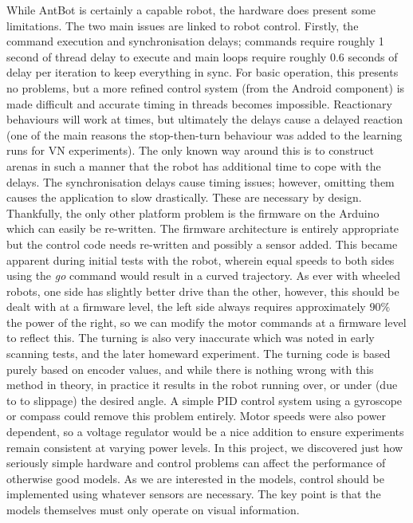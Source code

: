 \documentclass[a4paper,12pt,twoside,openright]{article}
\begin{document}
While AntBot is certainly a capable robot, the hardware does present some limitations. The two main issues
are linked to robot control. Firstly, the command execution and synchronisation delays; commands require roughly
1 second of thread delay to execute and main loops require roughly 0.6 seconds of delay per iteration to keep
everything in sync. For basic operation, this presents no problems, but a more refined control system (from the Android component)
is made difficult and accurate timing in threads becomes impossible. Reactionary
behaviours will work at times, but ultimately the delays cause a delayed reaction (one of the main reasons the
stop-then-turn behaviour was added to the learning runs for VN experiments). The only known way around this
is to construct arenas in such a manner that the robot has additional time to cope with the delays. The
synchronisation delays cause timing issues; however, omitting them causes the application to slow drastically.
These are necessary by design. Thankfully, the only other platform problem is the firmware on the Arduino
which can easily be re-written. The firmware architecture is entirely appropriate but the control code
needs re-written and possibly a sensor added. This became apparent during initial tests with the robot, wherein
equal speeds to both sides using the \textit{go} command would result in a curved trajectory. As ever with
wheeled robots, one side has slightly better drive than the other, however, this should be dealt with at a
firmware level, the left side always requires approximately $90\%$ the power of the right, so we can
modify the motor commands at a firmware level to reflect this. The turning is also very inaccurate which
was noted in early scanning tests, and the later homeward experiment. The turning code is based purely based on
encoder values, and while there is nothing wrong with this method in theory, in practice it results in the robot
running over, or under (due to to slippage) the desired angle. A simple PID control system using a gyroscope
or compass could remove this problem entirely. Motor speeds were also power dependent, so a voltage regulator
would be a nice addition to ensure experiments remain consistent at varying power levels.
In this project, we discovered just how seriously simple hardware and 
control problems can affect the performance of otherwise good models. As we are interested in the models,
control should be implemented using whatever sensors are necessary. The key point is that the models themselves
must only operate on visual information. 
\newpage
\end{document}
